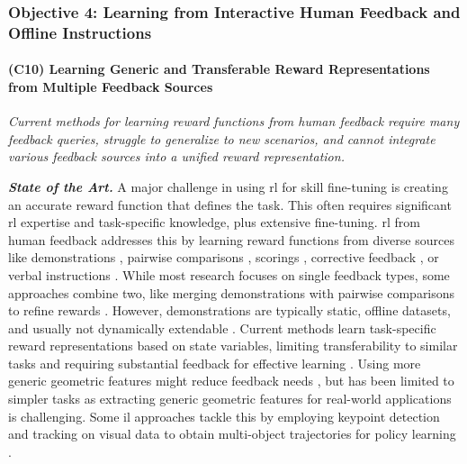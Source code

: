 \documentclass{erc-B2}
\begin{document}
\subsubsection{Objective 4: Learning from Interactive Human Feedback and Offline Instructions}

\paragraph{(C10) Learning Generic and Transferable Reward Representations from Multiple Feedback Sources}
\textit{Current methods for learning reward functions from human feedback require many feedback queries, struggle to generalize to new scenarios, and cannot integrate various feedback sources into a unified reward representation.}

\textit{\textbf{State of the Art.}}
A major challenge in using \gls*{rl} for skill fine-tuning is creating an accurate reward function that defines the task. This often requires significant \gls*{rl} expertise and task-specific knowledge, plus extensive fine-tuning. \gls*{rl} from human feedback addresses this by learning reward functions from diverse sources like demonstrations \cite{Takayuki2018ImitationLearning}, pairwise comparisons \cite{wirth2016PrefRL,ChristianoNIPS2017}, scorings \cite{Garrett2018DeepTamer}, corrective feedback \cite{Losey2022PCorrections}, or verbal instructions \cite{Pratyusha2020CorrectingNLF}. While most research focuses on single feedback types, some approaches combine two, like merging demonstrations with pairwise comparisons to refine rewards \cite{taranovic2023ailp}.
However, demonstrations are typically static, offline datasets, and usually not dynamically extendable \cite{taranovic2023ailp}. 
Current methods learn task-specific reward representations based on state variables, limiting transferability to similar tasks and requiring substantial feedback for effective learning \cite{brown2019drex, Biyik2018BatchPref}. Using more generic geometric features might reduce feedback needs \cite{freymuth2022vigor}, but has been limited to simpler tasks as extracting generic geometric features for real-world applications is challenging. Some \gls*{il} approaches tackle this by employing keypoint detection and tracking on visual data to obtain multi-object trajectories for policy learning \cite{Jianfeng2023KVIL}. %
\end{document}
